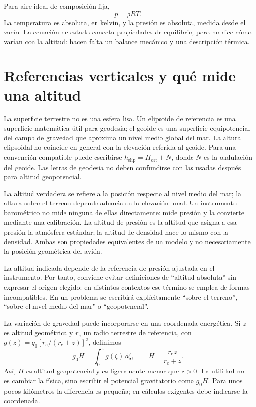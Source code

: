 Para aire ideal de composición fija,
\begin{equation}\label{eq:03-ideal}
 p=\rho RT.
\end{equation}
La temperatura es absoluta, en kelvin, y la presión es absoluta, medida desde el vacío. La ecuación de estado conecta propiedades de equilibrio, pero no dice cómo varían con la altitud: hacen falta un balance mecánico y una descripción térmica.

\section{Referencias verticales y qué mide una altitud}
La superficie terrestre no es una esfera lisa. Un elipsoide de referencia es una superficie matemática útil para geodesia; el geoide es una superficie equipotencial del campo de gravedad que aproxima un nivel medio global del mar. La altura elipsoidal no coincide en general con la elevación referida al geoide. Para una convención compatible puede escribirse $h_{\mathrm{elip}}=H_{\mathrm{ort}}+N$, donde $N$ es la ondulación del geoide. Las letras de geodesia no deben confundirse con las usadas después para altitud geopotencial.

La altitud verdadera se refiere a la posición respecto al nivel medio del mar; la altura sobre el terreno depende además de la elevación local. Un instrumento barométrico no mide ninguna de ellas directamente: mide presión y la convierte mediante una calibración. La altitud de presión es la altitud que asigna a esa presión la atmósfera estándar; la altitud de densidad hace lo mismo con la densidad. Ambas son propiedades equivalentes de un modelo y no necesariamente la posición geométrica del avión.

La altitud indicada depende de la referencia de presión ajustada en el instrumento. Por tanto, conviene evitar definiciones de ``altitud absoluta'' sin expresar el origen elegido: en distintos contextos ese término se emplea de formas incompatibles. En un problema se escribirá explícitamente ``sobre el terreno'', ``sobre el nivel medio del mar'' o ``geopotencial''.

La variación de gravedad puede incorporarse en una coordenada energética. Si $z$ es altitud geométrica y $r_e$ un radio terrestre de referencia, con $g(z)=g_0[r_e/(r_e+z)]^2$, definimos
\begin{equation}
 g_0H=\int_0^z g(\zeta)\,d\zeta,\qquad H=\frac{r_ez}{r_e+z}.
\end{equation}
Así, $H$ es altitud geopotencial y es ligeramente menor que $z>0$. La utilidad no es cambiar la física, sino escribir el potencial gravitatorio como $g_0H$. Para unos pocos kilómetros la diferencia es pequeña; en cálculos exigentes debe indicarse la coordenada.

